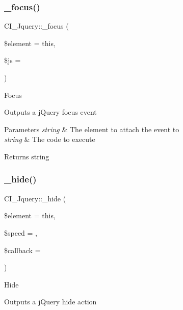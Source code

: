 \subsubsection{\texorpdfstring{\+\_\+focus()}{\_focus()}}
{\footnotesize\ttfamily C\+I\+\_\+\+Jquery\+::\+\_\+focus (\begin{DoxyParamCaption}\item[{}]{\$element = {\ttfamily \textquotesingle{}this\textquotesingle{}},  }\item[{}]{\$js = {\ttfamily \textquotesingle{}\textquotesingle{}} }\end{DoxyParamCaption})\hspace{0.3cm}{\ttfamily [protected]}}

Focus

Outputs a j\+Query focus event


\begin{DoxyParams}{Parameters}
{\em string} & The element to attach the event to \\
\hline
{\em string} & The code to execute \\
\hline
\end{DoxyParams}
\begin{DoxyReturn}{Returns}
string 
\end{DoxyReturn}
\mbox{\label{class_c_i___jquery_a6455866c894aa3f5f91106307e74af20}} 
\subsubsection{\texorpdfstring{\+\_\+hide()}{\_hide()}}
{\footnotesize\ttfamily C\+I\+\_\+\+Jquery\+::\+\_\+hide (\begin{DoxyParamCaption}\item[{}]{\$element = {\ttfamily \textquotesingle{}this\textquotesingle{}},  }\item[{}]{\$speed = {\ttfamily \textquotesingle{}\textquotesingle{}},  }\item[{}]{\$callback = {\ttfamily \textquotesingle{}\textquotesingle{}} }\end{DoxyParamCaption})\hspace{0.3cm}{\ttfamily [protected]}}

Hide

Outputs a j\+Query hide action


